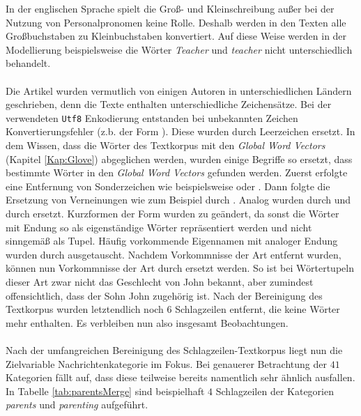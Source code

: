 \documentclass[a4paper,11pt]{article}
\begin{document}
In der englischen Sprache spielt die Groß- und Kleinschreibung außer bei der Nutzung von Personalpronomen keine Rolle. Deshalb werden in den Texten alle Großbuchstaben zu Kleinbuchstaben konvertiert. Auf diese Weise werden in der Modellierung beispielsweise die Wörter \textit{Teacher} und \textit{teacher} nicht unterschiedlich behandelt. \\
\\
Die Artikel wurden vermutlich von einigen Autoren in unterschiedlichen Ländern geschrieben, denn die Texte enthalten unterschiedliche Zeichensätze. Bei der verwendeten \texttt{Utf8} Enkodierung entstanden bei unbekannten Zeichen Konvertierungsfehler (z.b. der Form ). Diese wurden durch Leerzeichen ersetzt. In dem Wissen, dass die Wörter des Textkorpus mit den \textit{Global Word Vectors} (Kapitel \ref{Kap:Glove}) abgeglichen werden, wurden einige Begriffe so ersetzt, dass bestimmte Wörter in den \textit{Global Word Vectors} gefunden werden. Zuerst erfolgte eine Entfernung von Sonderzeichen wie beispielsweise  oder . Dann folgte die Ersetzung von Verneinungen wie zum Beispiel  durch . Analog wurden  durch  und  durch  ersetzt. Kurzformen der Form  wurden zu  geändert, da sonst die Wörter mit Endung  so als eigenständige Wörter repräsentiert werden und nicht sinngemäß als Tupel. Häufig vorkommende Eigennamen mit analoger Endung  wurden durch  ausgetauscht. Nachdem Vorkommnisse der Art  entfernt wurden, können nun Vorkommnisse der Art  durch  ersetzt werden. So ist bei Wörtertupeln dieser Art zwar nicht das Geschlecht von John bekannt, aber zumindest offensichtlich, dass der Sohn John zugehörig ist. Nach der Bereinigung des Textkorpus wurden letztendlich noch $6$ Schlagzeilen entfernt, die keine Wörter mehr enthalten. Es verbleiben nun also insgesamt  Beobachtungen.\\
\\
Nach der umfangreichen Bereinigung des Schlagzeilen-Textkorpus liegt nun die Zielvariable Nachrichtenkategorie im Fokus.
Bei genauerer Betrachtung der $41$ Kategorien fällt auf, dass diese teilweise bereits namentlich sehr ähnlich ausfallen. In Tabelle \ref{tab:parentsMerge} sind beispielhaft $4$ Schlagzeilen der Kategorien \textit{parents} und \textit{parenting} aufgeführt.
\end{document}
